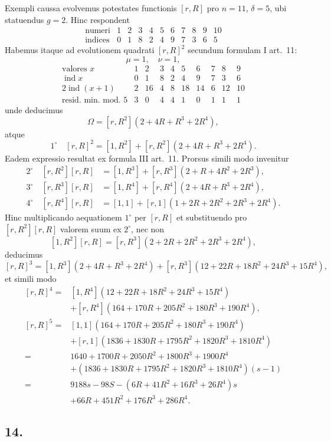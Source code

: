 \documentclass[12pt]{article}
\begin{document}
Exempli caussa evolvemus potestates functionis $[r,R]$ pro $n=11$, $\delta=5$, ubi statuendus $g=2$. Hinc respondent
\[
\begin{array}{c|cccccccccc}
\text{numeri}&1&2&3&4&5&6&7&8&9&10\\
\text{indices}&0&1&8&2&4&9&7&3&6&5
\end{array}
\]
Habemus itaque ad evolutionem quadrati $[r,R]^2$ secundum formulam I art.~11:
\[
\mu=1,\quad \nu=1,
\]
\[
\begin{array}{c|ccccccccc}
\text{valores }x&1&2&3&4&5&6&7&8&9\\
\operatorname{ind}x&0&1&8&2&4&9&7&3&6\\
2\operatorname{ind}(x+1)&2&16&4&8&18&14&6&12&10\\
\text{resid. min. mod. }5&3&0&4&4&1&0&1&1&1
\end{array}
\]
unde deducimus
\[
\Omega=[r,R^2](2+4R+R^3+2R^4),
\]
atque
\[
1^\circ\quad [r,R]^2=[1,R^2]+[r,R^2](2+4R+R^3+2R^4).
\]
Eadem expressio resultat ex formula III art.~11. Prorsus simili modo invenitur
\[
\begin{aligned}
2^\circ\quad [r,R^2][r,R]&=[1,R^3]+[r,R^3](2+R+4R^2+2R^3),\\
3^\circ\quad [r,R^3][r,R]&=[1,R^4]+[r,R^4](2+4R+R^3+2R^4),\\
4^\circ\quad [r,R^4][r,R]&=[1,1]+[r,1](1+2R+2R^2+2R^3+2R^4).
\end{aligned}
\]
Hinc multiplicando aequationem $1^\circ$ per $[r,R]$ et substituendo pro $[r,R^2][r,R]$ valorem suum ex $2^\circ$, nec non
\[
[1,R^2][r,R]=[r,R^3](2+2R+2R^2+2R^3+2R^4),
\]
deducimus
\[
[r,R]^3=[1,R^3](2+4R+R^3+2R^4)
+[r,R^3](12+22R+18R^2+24R^3+15R^4),
\]
et simili modo
\[
\begin{aligned}
[r,R]^4={}&[1,R^4](12+22R+18R^2+24R^3+15R^4)\\
&+[r,R^4](164+170R+205R^2+180R^3+190R^4),\\
[r,R]^5={}&[1,1](164+170R+205R^2+180R^3+190R^4)\\
&+[r,1](1836+1830R+1795R^2+1820R^3+1810R^4)\\
={}&1640+1700R+2050R^2+1800R^3+1900R^4\\
&+(1836+1830R+1795R^2+1820R^3+1810R^4)(s-1)\\
={}&9188s-98S-(6R+41R^2+16R^3+26R^4)s\\
&+66R+451R^2+176R^3+286R^4.
\end{aligned}
\]

\subsection*{14.}
\end{document}
